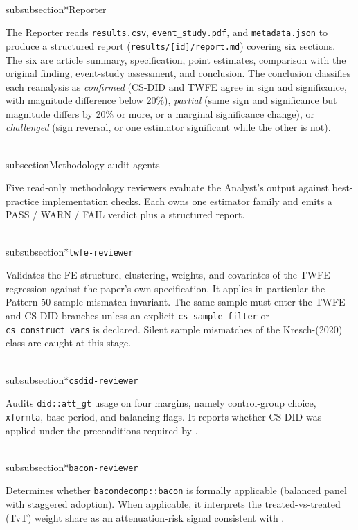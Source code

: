 \\subsubsection*{Reporter}

The Reporter reads \texttt{results.csv}, \texttt{event\_study.pdf}, and \texttt{metadata.json} to produce a structured report (\texttt{results/[id]/report.md}) covering six sections. The six are article summary, specification, point estimates, comparison with the original finding, event-study assessment, and conclusion. The conclusion classifies each reanalysis as \emph{confirmed} (CS-DID and TWFE agree in sign and significance, with magnitude difference below 20\%), \emph{partial} (same sign and significance but magnitude differs by 20\% or more, or a marginal significance change), or \emph{challenged} (sign reversal, or one estimator significant while the other is not).


\\subsection{Methodology audit agents}
\label{sec:appc_reviewers}

Five read-only methodology reviewers evaluate the Analyst's output against best-practice implementation checks. Each owns one estimator family and emits a PASS / WARN / FAIL verdict plus a structured report.

\\subsubsection*{\texttt{twfe-reviewer}}

Validates the FE structure, clustering, weights, and covariates of the TWFE regression against the paper's own specification. It applies in particular the Pattern-50 sample-mismatch invariant. The same sample must enter the TWFE and CS-DID branches unless an explicit \texttt{cs\_sample\_filter} or \texttt{cs\_construct\_vars} is declared. Silent sample mismatches of the Kresch-(2020) class are caught at this stage.

\\subsubsection*{\texttt{csdid-reviewer}}

Audits \texttt{did::att\_gt} usage on four margins, namely control-group choice, \texttt{xformla}, base period, and balancing flags. It reports whether CS-DID was applied under the preconditions required by \textcite{callaway2021difference}.

\\subsubsection*{\texttt{bacon-reviewer}}

Determines whether \texttt{bacondecomp::bacon} is formally applicable (balanced panel with staggered adoption). When applicable, it interprets the treated-vs-treated (TvT) weight share as an attenuation-risk signal consistent with \textcite{goodman2021difference}.

